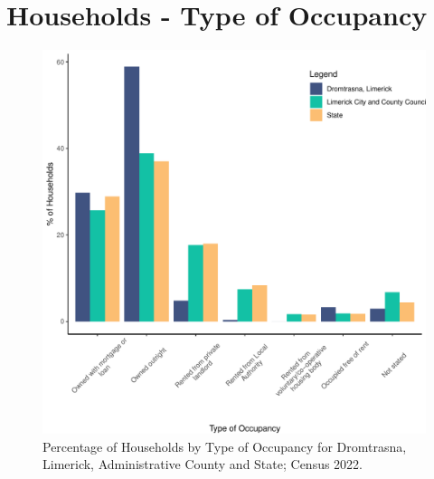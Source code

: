 \documentclass{article}
\begin{document}
\section{Households - Type of Occupancy}\label{sect:Households}
\begin{figure}[H]
	\centering
	\includegraphics[width = 140mm]{../figures/HouseholdsED.pdf}
	\caption{Percentage of Households by Type of Occupancy for Dromtrasna, Limerick, Administrative County and State; Census 2022.}
	\label{fig:vbnv}
	\end{figure}
\end{document}
